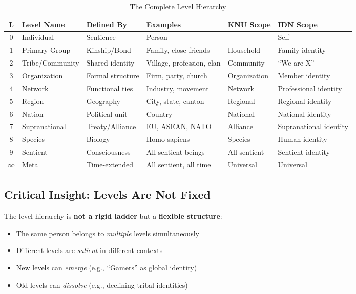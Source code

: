 \begin{table}[htbp]
\centering
\caption{The Complete Level Hierarchy}
\label{tab:aaa-hierarchy}
\renewcommand{\arraystretch}{1.4}
\begin{tabular}{@{}clllll@{}}
\toprule
\textbf{L} & \textbf{Level Name} & \textbf{Defined By} & \textbf{Examples} & \textbf{KNU Scope} & \textbf{IDN Scope} \\
\midrule
0 & Individual & Sentience & Person & --- & Self \\
1 & Primary Group & Kinship/Bond & Family, close friends & Household & Family identity \\
2 & Tribe/Community & Shared identity & Village, profession, clan & Community & ``We are X'' \\
3 & Organization & Formal structure & Firm, party, church & Organization & Member identity \\
4 & Network & Functional ties & Industry, movement & Network & Professional identity \\
5 & Region & Geography & City, state, canton & Regional & Regional identity \\
6 & Nation & Political unit & Country & National & National identity \\
7 & Supranational & Treaty/Alliance & EU, ASEAN, NATO & Alliance & Supranational identity \\
8 & Species & Biology & Homo sapiens & Species & Human identity \\
9 & Sentient & Consciousness & All sentient beings & All sentient & Sentient identity \\
$\infty$ & Meta & Time-extended & All sentient, all time & Universal & Universal \\
\bottomrule
\end{tabular}
\end{table}

\subsection{Critical Insight: Levels Are Not Fixed}

\begin{tcolorbox}[colback=yellow!10!white, colframe=yellow!50!black, title=Key Insight]
The level hierarchy is \textbf{not a rigid ladder} but a \textbf{flexible structure}:
\begin{itemize}
\item The same person belongs to \emph{multiple} levels simultaneously
\item Different levels are \emph{salient} in different contexts
\item New levels can \emph{emerge} (e.g., ``Gamers'' as global identity)
\item Old levels can \emph{dissolve} (e.g., declining tribal identities)
\end{itemize}
\end{tcolorbox}


